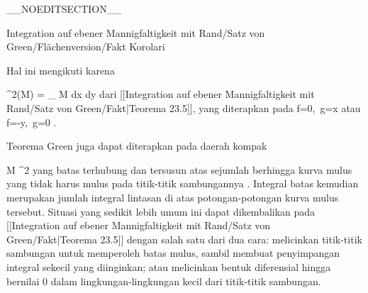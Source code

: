 __NOEDITSECTION__

{Integration auf ebener Mannigfaltigkeit mit Rand/Satz von Green/Flächenversion/Fakt}
{Korolari}
{}
{

\faktzusatz {}
\faktzusatz {}

}
{

Hal ini mengikuti karena

\mavergleichskette
{\vergleichskette
{ \lambda^2(M)
}
{ = }{
\int_{ M  }  dx \wedge dy
}
{  }{
}
{    }{
}
{   }{
}
}
{}{}{}
dari
[[Integration auf ebener Mannigfaltigkeit mit Rand/Satz von Green/Fakt|Teorema 23.5]],
yang diterapkan pada
\mathkor {} {f=0,\, g=x} {atau} {f=-y,\, g=0} {.}

}

{}
{

Teorema Green juga dapat diterapkan pada daerah kompak

\mavergleichskette
{\vergleichskette
{ M
}
{ \subseteq }{ \R^2
}
{  }{
}
{    }{
}
{   }{
}
}
{}{}{}
yang batas
 {} {}
terhubung dan tersusun atas sejumlah berhingga kurva mulus yang tidak harus mulus pada titik-titik sambungannya
 {} {.}
Integral batas kemudian merupakan jumlah integral lintasan di atas potongan-potongan kurva mulus tersebut. Situasi yang sedikit lebih umum ini dapat dikembalikan pada
[[Integration auf ebener Mannigfaltigkeit mit Rand/Satz von Green/Fakt|Teorema 23.5]]
dengan salah satu dari dua cara: melicinkan titik-titik sambungan untuk memperoleh batas mulus, sambil membuat penyimpangan integral sekecil yang diinginkan; atau melicinkan bentuk diferensial hingga bernilai $0$ dalam lingkungan-lingkungan kecil dari titik-titik sambungan.

}

